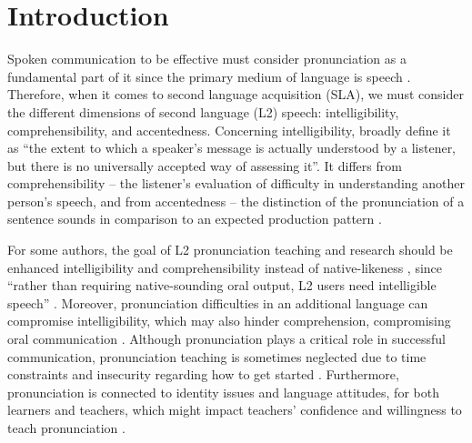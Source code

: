 \documentclass[english]{textolivre}
\begin{document}
\begin{polyabstract}
\begin{portuguese}
\begin{abstract}
\end{abstract}
\end{portuguese}
\end{polyabstract}

\section{Introduction}\label{sec-intro}
Spoken communication to be effective must consider pronunciation as a fundamental part of it \cite{pennington2019} since the primary medium of language is speech \cite{slabakova2016}. Therefore, when it comes to second language acquisition (SLA), we must consider the different dimensions of second language (L2) speech: intelligibility, comprehensibility, and accentedness. Concerning intelligibility, \textcite[p. 189]{munro1995} broadly define it as “the extent to which a speaker’s message is actually understood by a listener, but there is no universally accepted way of assessing it”. It differs from comprehensibility – the listener’s evaluation of difficulty in understanding another person’s speech, and from accentedness – the distinction of the pronunciation of a sentence sounds in comparison to an expected production pattern \cite{munro2006}.

For some authors, the goal of L2 pronunciation teaching and research should be enhanced intelligibility and comprehensibility instead of native-likeness \cite{obrien2018}, since “rather than requiring native-sounding oral output, L2 users need intelligible speech” \cite[p. 213]{munro2008}. Moreover, pronunciation difficulties in an additional language can compromise intelligibility, which may also hinder comprehension, compromising oral communication \cite{sicola2015}. Although pronunciation plays a critical role in successful communication, pronunciation teaching is sometimes neglected due to time constraints and insecurity regarding how to get started \cite{roccamo2014}. Furthermore, pronunciation is connected to identity issues and language attitudes, for both learners and teachers, which might impact teachers’ confidence and willingness to teach pronunciation \cite{pennington2019}.
\end{document}
